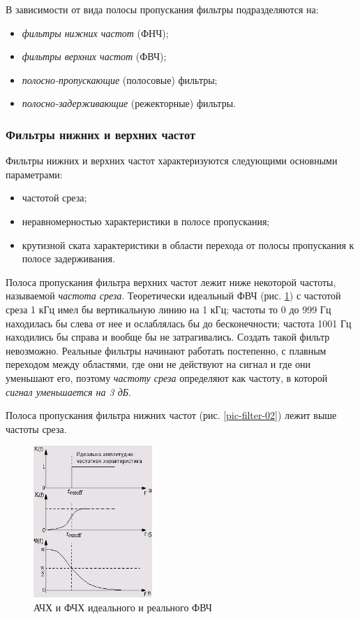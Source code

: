 \documentclass[oneside, final, 14pt]{extreport}
\begin{document}
В зависимости от вида полосы пропускания фильтры подразделяются на:
\begin{itemize}
  \item \emph{фильтры нижних частот} (ФНЧ);
  \item \emph{фильтры верхних частот} (ФВЧ);
  \item \emph{полосно-пропускающие} (полосовые) фильтры;
  \item \emph{полосно-задерживающие} (режекторные) фильтры.
\end{itemize}

\subsubsection{Фильтры нижних и верхних частот}
Фильтры нижних и верхних частот характеризуются следующими основными параметрами:
\begin{itemize}
  \item частотой среза;
  \item неравномерностью характеристики в полосе пропускания;
  \item крутизной ската характеристики в области перехода от полосы пропускания к полосе задерживания.
\end{itemize}

Полоса пропускания фильтра верхних частот лежит ниже некоторой частоты, называемой \emph{частота среза}. Теоретически идеальный ФВЧ (рис. \ref{pic-filter-01}) с частотой среза 1 кГц имел бы вертикальную линию на 1 кГц; частоты то 0 до 999 Гц находилась бы слева от нее и ослаблялась бы до бесконечности; частота 1001 Гц находились бы справа и вообще бы не затрагивались. Создать такой фильтр невозможно. Реальные фильтры начинают работать постепенно, с плавным переходом между областями, где они не действуют на сигнал и где они уменьшают его, поэтому \emph{частоту среза} определяют как частоту, в которой \emph{сигнал уменьшается на 3 дБ}.

Полоса пропускания фильтра нижних частот (рис. \ref{pic-filter-02}) лежит выше частоты среза.

\begin{figure}[h!]
  \centering
  \includegraphics[width=0.4\textwidth]{pic-filter-01}
  \caption{АЧХ и ФЧХ идеального и реального ФВЧ}
  \label{pic-filter-01}
\end{figure}
\end{document}
